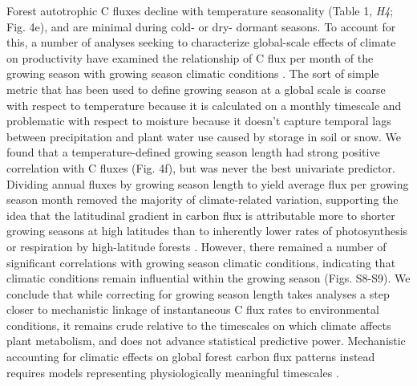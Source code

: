\documentclass[
]{article}
\begin{document}
{Forest autotrophic C fluxes decline with temperature seasonality (Table
1, \emph{H4}; Fig. 4e), and are minimal during cold- or dry- dormant
seasons. To account for this, a number of analyses seeking to
characterize global-scale effects of climate on productivity have
examined the relationship of C flux per month of the growing season with
growing season climatic conditions \citep[Table 1,
\emph{H5};][]{kerkhoff_plant_2005, anderson_temperature-dependence_2006, enquist_adaptive_2007, michaletz_convergence_2014}.
The sort of simple metric that has been used to define growing season at
a global scale \citep{kerkhoff_plant_2005} is coarse with respect to
temperature because it is calculated on a monthly timescale and
problematic with respect to moisture because it doesn't capture temporal
lags between precipitation and plant water use caused by storage in soil
or snow. We found that a temperature-defined growing season length had
strong positive correlation with C fluxes (Fig. 4f), but was never the
best univariate predictor. Dividing annual fluxes by growing season
length to yield average flux per growing season month removed the
majority of climate-related variation, supporting the idea that the
latitudinal gradient in carbon flux is attributable more to shorter
growing seasons at high latitudes than to inherently lower rates of
photosynthesis or respiration by high-latitude forests
\citep{enquist_adaptive_2007}. However, there remained a number of
significant correlations with growing season climatic conditions,
indicating that climatic conditions remain influential within the
growing season (Figs. S8-S9). We conclude that while correcting for
growing season length takes analyses a step closer to mechanistic
linkage of instantaneous C flux rates to environmental conditions, it
remains crude relative to the timescales on which climate affects plant
metabolism, and does not advance statistical predictive power.
Mechanistic accounting for climatic effects on global forest carbon flux
patterns instead requires models representing physiologically meaningful
timescales
\citep[e.g.,][]{medvigy_mechanistic_2009, longo_biophysics_2019}.

}
\end{document}
